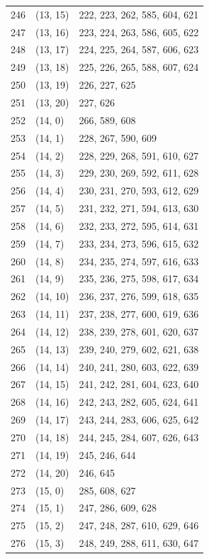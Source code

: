 \documentclass{article}
\begin{document}
\begin{longtable}{lll}
  246 & (13, 15) & 222, 223, 262, 585, 604, 621 \\
  247 & (13, 16) & 223, 224, 263, 586, 605, 622 \\
  248 & (13, 17) & 224, 225, 264, 587, 606, 623 \\
  249 & (13, 18) & 225, 226, 265, 588, 607, 624 \\
  250 & (13, 19) & 226, 227, 625 \\
  251 & (13, 20) & 227, 626 \\
  252 & (14, 0) & 266, 589, 608 \\
  253 & (14, 1) & 228, 267, 590, 609 \\
  254 & (14, 2) & 228, 229, 268, 591, 610, 627 \\
  255 & (14, 3) & 229, 230, 269, 592, 611, 628 \\
  256 & (14, 4) & 230, 231, 270, 593, 612, 629 \\
  257 & (14, 5) & 231, 232, 271, 594, 613, 630 \\
  258 & (14, 6) & 232, 233, 272, 595, 614, 631 \\
  259 & (14, 7) & 233, 234, 273, 596, 615, 632 \\
  260 & (14, 8) & 234, 235, 274, 597, 616, 633 \\
  261 & (14, 9) & 235, 236, 275, 598, 617, 634 \\
  262 & (14, 10) & 236, 237, 276, 599, 618, 635 \\
  263 & (14, 11) & 237, 238, 277, 600, 619, 636 \\
  264 & (14, 12) & 238, 239, 278, 601, 620, 637 \\
  265 & (14, 13) & 239, 240, 279, 602, 621, 638 \\
  266 & (14, 14) & 240, 241, 280, 603, 622, 639 \\
  267 & (14, 15) & 241, 242, 281, 604, 623, 640 \\
  268 & (14, 16) & 242, 243, 282, 605, 624, 641 \\
  269 & (14, 17) & 243, 244, 283, 606, 625, 642 \\
  270 & (14, 18) & 244, 245, 284, 607, 626, 643 \\
  271 & (14, 19) & 245, 246, 644 \\
  272 & (14, 20) & 246, 645 \\
  273 & (15, 0) & 285, 608, 627 \\
  274 & (15, 1) & 247, 286, 609, 628 \\
  275 & (15, 2) & 247, 248, 287, 610, 629, 646 \\
  276 & (15, 3) & 248, 249, 288, 611, 630, 647 \\

\end{longtable}
\end{document}
